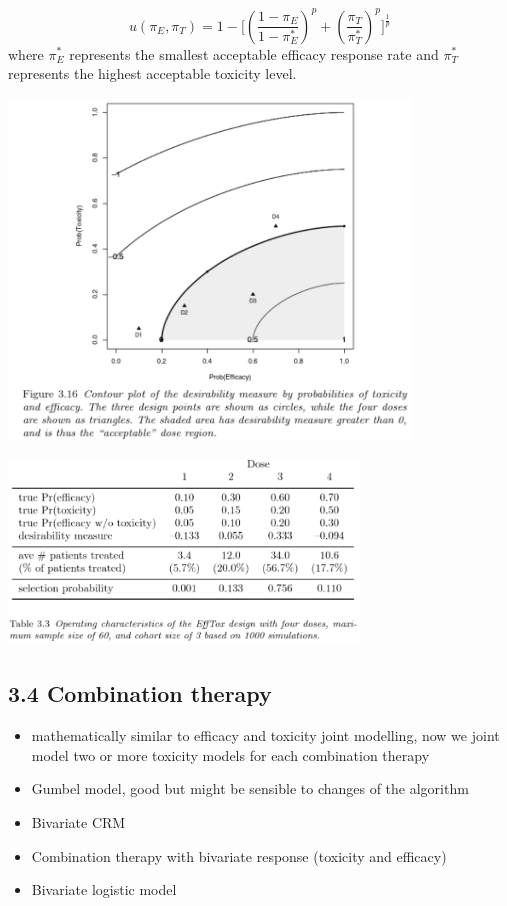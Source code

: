 \documentclass[
]{article}
\begin{document}
\[ u(\pi_E, \pi_T) = 1 - \Big[ (\frac{1-\pi_E}{1-\pi_E^{*}})^p + (\frac{\pi_T}{\pi_T^{*}})^p \Big]^{\frac{1}{p}}\]
where \(\pi_E^{*}\) represents the smallest acceptable efficacy response
rate and \(\pi_T^{*}\) represents the highest acceptable toxicity level.

\includegraphics[width=0.8\textwidth,height=\textheight]{Figure3.16.PNG}

\includegraphics[width=0.7\textwidth,height=\textheight]{Table3.3.PNG}

\hypertarget{combination-therapy}{%
\subsection{3.4 Combination therapy}\label{combination-therapy}}

\begin{itemize}
\item
  mathematically similar to efficacy and toxicity joint modelling, now
  we joint model two or more toxicity models for each combination
  therapy
\item
  Gumbel model, good but might be sensible to changes of the algorithm
\item
  Bivariate CRM
\item
  Combination therapy with bivariate response (toxicity and efficacy)
\item
  Bivariate logistic model
\end{itemize}
\end{document}
